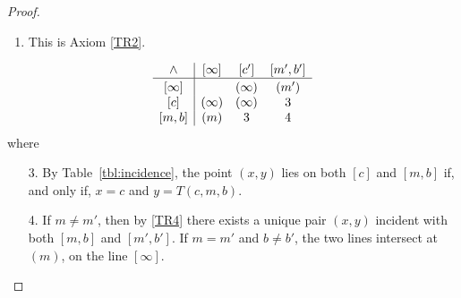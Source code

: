 \begin{proof}
\begin{description}[font=\normalfont\small\scshape]
\begin{enumerate}
            \item This is Axiom \ref{TR2}.
        \end{enumerate}

        \item[Axiom p$_2$:]
        $$
            \begin{array}{c|ccc}
                \wedge& {[\infty]} & {[c']} & {[m',b']}\\
                \hline\rule{0pt}{10pt}
                {[\infty]} &&{(\infty)}&{(m')} \\
                {[c]} &{(\infty)} &{(\infty)}&3\\
                {[m,b]} &{(m)} &3 &4
            \end{array}
        $$
        where
        \begin{enumerate}
            \item[3.] By Table~\eqref{tbl:incidence}, the point $(x,y)$ lies on both $[c]$ and $[m,b]$ if, and only if, $x=c$ and $y=T(c,m,b)$.

            \item[4.] If $m\ne m'$, then by \ref{TR4} there exists a unique pair $(x,y)$ incident with both $[m,b]$ and $[m',b']$. If $m=m'$ and $b\ne b'$, the two lines intersect at $(m)$, on the line $[\infty]$.
        \end{enumerate}


\end{description}
\end{proof}

